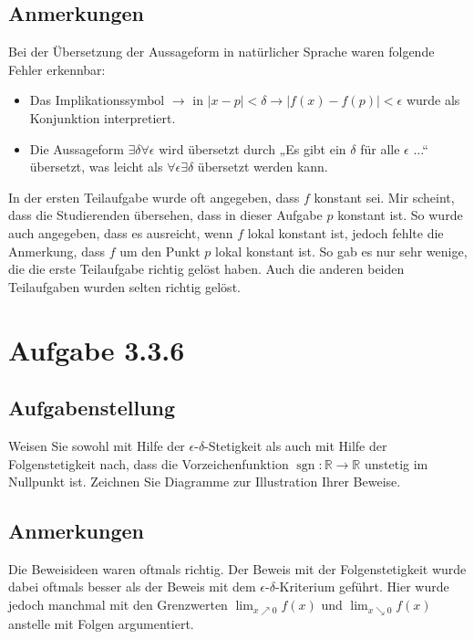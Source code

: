 \documentclass[a4paper]{article}
\newcommand*{\R}{\mathbb R}
\begin{document}
\subsection{Anmerkungen}

Bei der Übersetzung der Aussageform in natürlicher Sprache waren folgende Fehler erkennbar:

\begin{itemize}
  \item Das Implikationssymbol $\to$ in $|x-p|<\delta \to |f(x)-f(p)|<\epsilon$ wurde als Konjunktion interpretiert.
  \item Die Aussageform $\exists \delta \forall \epsilon$ wird übersetzt durch „Es gibt ein $\delta$ für alle $\epsilon$ ...“ übersetzt, was leicht als $\forall \epsilon \exists \delta$ übersetzt werden kann.
\end{itemize}

In der ersten Teilaufgabe wurde oft angegeben, dass $f$ konstant sei. Mir scheint, dass die Studierenden übersehen, dass in dieser Aufgabe $p$ konstant ist. So wurde auch angegeben, dass es ausreicht, wenn $f$ lokal konstant ist, jedoch fehlte die Anmerkung, dass $f$ um den Punkt $p$ lokal konstant ist. So gab es nur sehr wenige, die die erste Teilaufgabe richtig gelöst haben. Auch die anderen beiden Teilaufgaben wurden selten richtig gelöst.

\section{Aufgabe 3.3.6}

\subsection{Aufgabenstellung}

Weisen Sie sowohl mit Hilfe der $\epsilon$-$\delta$-Stetigkeit als auch mit Hilfe der Folgenstetigkeit nach, dass die Vorzeichenfunktion $\operatorname{sgn}:\R\to\R$ unstetig im Nullpunkt ist. Zeichnen Sie Diagramme zur Illustration Ihrer Beweise.

\subsection{Anmerkungen}

Die Beweisideen waren oftmals richtig. Der Beweis mit der Folgenstetigkeit wurde dabei oftmals besser als der Beweis mit dem $\epsilon$-$\delta$-Kriterium geführt. Hier wurde jedoch manchmal mit den Grenzwerten $\lim_{x\nearrow0} f(x)$ und $\lim_{x\searrow0} f(x)$ anstelle mit Folgen argumentiert.
\end{document}
